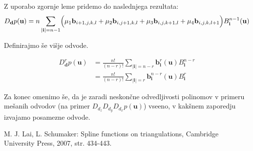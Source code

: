 \documentclass[a4paper, 12pt]{article}
\theoremstyle{definition} %
\theoremstyle{plain} %
\begin{document}
    Z uporabo zgornje leme pridemo do naslednjega rezultata:
    $$
    D_{\textbf{d}}p(\textbf{u})= n\sum_{|\textbf{i}|=n-1}\Bigl(\mu_1\textbf{b}_{i+1,j,k,l}+\mu_2\textbf{b}_{i,j+1,k,l}+\mu_3\textbf{b}_{i,j,k+1,l}+\mu_4\textbf{b}_{i,j,k,l+1}\Bigr)B_{\textbf{i}}^{n-1}(\textbf{u})
    $$

    Definirajmo še višje odvode.

    \begin{align*}
      D_{\textbf{d}}^rp(\textbf{u})&=\frac{n!}{(n-r)!}\sum_{|\textbf{i}|=n-r}\textbf{b}_{\textbf{i}}^r(\textbf{u})B_{\textbf{i}}^{n-r}\\
      &=\frac{n!}{(n-r)!}\sum_{|\textbf{i}|=r}\textbf{b}_{\textbf{i}}^{n-r}(\textbf{u})B_{\textbf{i}}^{r}
    \end{align*}

    Za konec omenimo še, da je zaradi neskončne odvedljivosti polinomov 
    v primeru mešanih odvodov (na primer $D_{d_z}D_{d_y}D_{d_x}p(\textbf{u})$) vseeno,
    v kakšnem zaporedju izvajamo posamezne odvode.



\begin{thebibliography}{99}
   M. J. Lai, L. Schumaker: Spline functions on triangulations, Cambridge University Press, 2007, str. 434-443.

\end{thebibliography}
\end{document}
